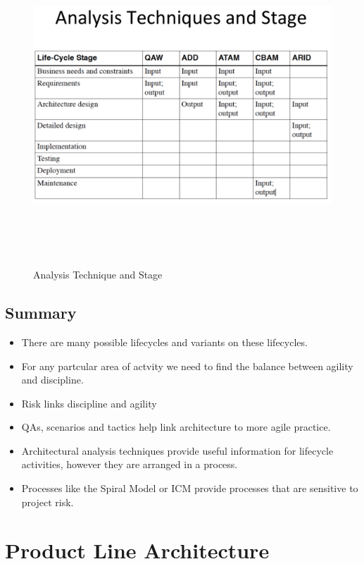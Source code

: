 \documentclass[a4paper]{report}
\begin{document}
\begin{figure}[h]
\begin{center} 
    \includegraphics[scale=0.8,width = 15cm, height = 12cm]{images/Analysis2.pdf}
    \caption{Analysis Technique and Stage}
\end{center}
\end{figure}

\section{Summary}
\begin{itemize}
\item There are	many possible lifecycles and variants on	
these lifecycles.	
\item For any partcular	area of	actvity	we need to find the	
balance	between	agility	and	discipline.	
\item  Risk	links	discipline	and	agility	
\item QAs, scenarios and tactics help link architecture to	
more agile practice.	
\item Architectural	analysis techniques	provide	useful	
information for lifecycle activities, however they are	
arranged in	a process.	
\item Processes	like the Spiral	Model or ICM provide	
processes that are	sensitive to project risk.
\end{itemize}

\chapter{Product Line Architecture}
\end{document}
